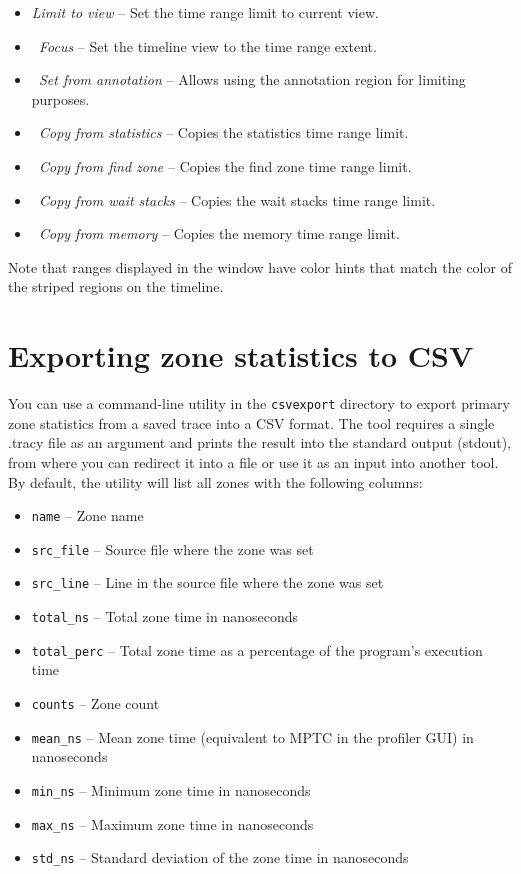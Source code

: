 \documentclass[hidelinks,titlepage,a4paper]{article}
\begin{document}
\begin{itemize}
\item \emph{Limit to view} -- Set the time range limit to current view.
\item \emph{\faMicroscope{}~Focus} -- Set the timeline view to the time range extent.
\item \emph{\faStickyNote{}~Set from annotation} -- Allows using the annotation region for limiting purposes.
\item \emph{\faSortAmountUp{}~Copy from statistics} -- Copies the statistics time range limit.
\item \emph{\faSearch{}~Copy from find zone} -- Copies the find zone time range limit.
\item \emph{\faHourglassHalf{}~Copy from wait stacks} -- Copies the wait stacks time range limit.
\item \emph{\faMemory{}~Copy from memory} -- Copies the memory time range limit.
\end{itemize}

Note that ranges displayed in the window have color hints that match the color of the striped regions on the timeline.

\section{Exporting zone statistics to CSV}
\label{csvexport}

You can use a command-line utility in the \texttt{csvexport} directory to export primary zone statistics from a saved trace into a CSV format.
The tool requires a single .tracy file as an argument and prints the result into the standard output (stdout), from where you can redirect it into a file or use it as an input into another tool.
By default, the utility will list all zones with the following columns:

\begin{itemize}
  \item \texttt{name} -- Zone name
  \item \texttt{src\_file} -- Source file where the zone was set
  \item \texttt{src\_line} -- Line in the source file where the zone was set
  \item \texttt{total\_ns} -- Total zone time in nanoseconds
  \item \texttt{total\_perc} -- Total zone time as a percentage of the program's execution time
  \item \texttt{counts} -- Zone count
  \item \texttt{mean\_ns} -- Mean zone time (equivalent to MPTC in the profiler GUI) in nanoseconds
  \item \texttt{min\_ns} -- Minimum zone time in nanoseconds
  \item \texttt{max\_ns} -- Maximum zone time in nanoseconds
  \item \texttt{std\_ns} -- Standard deviation of the zone time in nanoseconds
\end{itemize}
\end{document}

